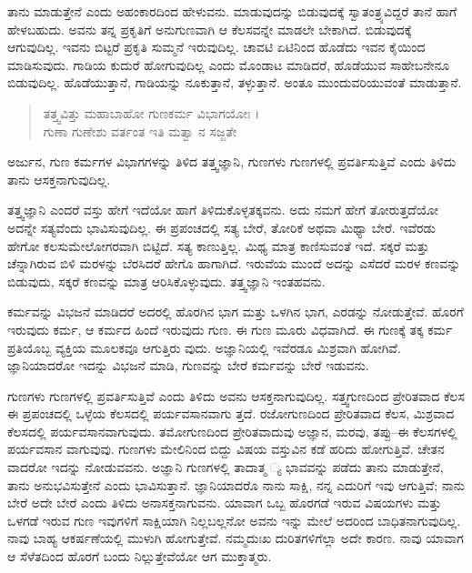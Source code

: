 ತಾನು ಮಾಡುತ್ತೇನೆ ಎಂದು ಅಹಂಕಾರದಿಂದ ಹೇಳುವನು. ಮಾಡುವುದನ್ನು ಬಿಡುವುದಕ್ಕೆ ಸ್ವಾತಂತ್ರ್ಯವಿದ್ದರೆ ತಾನೆ ಹಾಗೆ ಹೇಳಬಹುದು. ಅವನು ತನ್ನ ಪ್ರಕೃತಿಗೆ ಅನುಗುಣವಾಗಿ ಆ ಕೆಲಸವನ್ನೇ ಮಾಡಲೇ ಬೇಕಾಗಿದೆ. ಬಿಡುವುದಕ್ಕೆ ಆಗುವುದಿಲ್ಲ. ಇವನು ಬಿಟ್ಟರೆ ಪ್ರಕೃತಿ ಸುಮ್ಮನೆ ಇರುವುದಿಲ್ಲ. ಚಾವಟಿ ಏಟಿನಿಂದ ಹೊಡೆದು ಇವನ ಕೈಯಿಂದ ಮಾಡಿಸುವುದು. ಗಾಡಿಯ ಕುದುರೆ ಹೋಗುವುದಿಲ್ಲ ಎಂದು ಮೊಂಡಾಟ ಮಾಡಿದರೆ, ಹೊಡೆಯುವ ಸಾಹೇಬನೇನೂ ಬಿಡುವುದಿಲ್ಲ. ಹೊಡೆಯುತ್ತಾನೆ, ಗಾಡಿಯನ್ನು ನೂಕುತ್ತಾನೆ, ತಳ್ಳುತ್ತಾನೆ. ಅಂತೂ ಮುಂದುವರಿಯುವಂತೆ ಮಾಡುತ್ತಾನೆ.

\begin{verse}
ತತ್ತ್ವವಿತ್ತು ಮಹಾಬಾಹೋ ಗುಣಕರ್ಮ ವಿಭಾಗಯೋಃ ।\\ಗುಣಾ ಗುಣೇಶು ವರ್ತಂತ ಇತಿ ಮತ್ವಾ ನ ಸಜ್ಜತೇ 
\end{verse}

{\small ಅರ್ಜುನ, ಗುಣ ಕರ್ಮಗಳ ವಿಭಾಗಗಳನ್ನು ತಿಳಿದ ತತ್ತ್ವಜ್ಞಾನಿ, ಗುಣಗಳು ಗುಣಗಳಲ್ಲಿ ಪ್ರವರ್ತಿಸುತ್ತಿವೆ ಎಂದು ತಿಳಿದು ತಾನು ಆಸಕ್ತನಾಗುವುದಿಲ್ಲ.}

ತತ್ತ್ವಜ್ಞಾನಿ ಎಂದರೆ ವಸ್ತು ಹೇಗೆ ಇದೆಯೋ ಹಾಗೆ ತಿಳಿದುಕೊಳ್ಳತಕ್ಕವನು. ಅದು ನಮಗೆ ಹೇಗೆ ತೋರುತ್ತದೆಯೋ ಅದನ್ನೇ ಸತ್ಯವೆಂದು ಭಾವಿಸುವುದಿಲ್ಲ. ಈ ಪ್ರಪಂಚದಲ್ಲಿ ಸತ್ಯ ಬೇರೆ, ತೋರಿಕೆ ಅಥವಾ ಮಿಥ್ಯಾ ಬೇರೆ. ಇವೆರಡು ಹೇಗೋ ಕಲಸುಮೇಲೋಗರವಾಗಿ ಬಿಟ್ಟಿದೆ. ಸತ್ಯ ಕಾಣುತ್ತಿಲ್ಲ. ಮಿಥ್ಯ ಮಾತ್ರ ಕಾಣಿಸುವಂತೆ ಇದೆ. ಸಕ್ಕರೆ ಮತ್ತು ಚೆನ್ನಾಗಿರುವ ಬಿಳಿ ಮರಳನ್ನು ಬೆರಸಿದರೆ ಹೇಗೊ ಹಾಗಾಗಿದೆ. ಇರುವೆಯ ಮುಂದೆ ಅದನ್ನು ಎಸೆದರೆ ಮರಳ ಕಣವನ್ನು ಬಿಡುವುದು, ಸಕ್ಕರೆ ಕಣವನ್ನು ಮಾತ್ರ ಆರಿಸಿಕೊಳ್ಳುವುದು. ತತ್ತ್ವಜ್ಞಾನಿ ಇಂತಹವನು.

ಕರ್ಮವನ್ನು ವಿಭಜನೆ ಮಾಡಿದರೆ ಅದರಲ್ಲಿ ಹೊರಗಿನ ಭಾಗ ಮತ್ತು ಒಳಗಿನ ಭಾಗ, ಎರಡನ್ನು ನೋಡುತ್ತೇವೆ. ಹೊರಗೆ ಇರುವುದು ಕರ್ಮ, ಆ ಕರ್ಮದ ಹಿಂದೆ ಇರುವುದು ಗುಣ. ಈ ಗುಣ ಮೂರು ವಿಧವಾಗಿದೆ. ಈ ಗುಣಕ್ಕೆ ತಕ್ಕ ಕರ್ಮ ಪ್ರತಿಯೊಬ್ಬ ವ್ಯಕ್ತಿಯ ಮೂಲಕವೂ ಆಗುತ್ತಿರು ವುದು. ಅಜ್ಞಾನಿಯಲ್ಲಿ ಇವೆರಡೂ ಮಿಶ್ರವಾಗಿ ಹೋಗಿವೆ. ಜ್ಞಾನಿಯಾದರೋ ಇದನ್ನು ವಿಭಜನೆ ಮಾಡಿ, ಗುಣವನ್ನು ಬೇರೆ ಕರ್ಮವನ್ನು ಬೇರೆ ಇಡುವನು.

ಗುಣಗಳು ಗುಣಗಳಲ್ಲಿ ಪ್ರವರ್ತಿಸುತ್ತಿವೆ ಎಂದು ತಿಳಿದು ಅವನು ಆಸಕ್ತನಾಗುವುದಿಲ್ಲ. ಸತ್ತ್ವಗುಣದಿಂದ ಪ್ರೇರಿತವಾದ ಕೆಲಸ ಈ ಪ್ರಪಂಚದಲ್ಲಿ ಒಳ್ಳೆಯ ಕೆಲಸದಲ್ಲಿ ಪರ್ಯವಸಾನವಾಗು ತ್ತದೆ. ರಜೋಗುಣದಿಂದ ಪ್ರೇರಿತವಾದ ಕೆಲಸ, ಮಿಶ್ರವಾದ ಕೆಲಸದಲ್ಲಿ ಪರ್ಯವಸಾನವಾಗುವುದು. ತಮೋಗುಣದಿಂದ ಪ್ರೇರಿತವಾದುವು ಅಜ್ಞಾನ, ಮರವು, ತಪ್ಪು–ಈ ಕೆಲಸಗಳಲ್ಲಿ ಪರ್ಯವಸಾನ ವಾಗುವುವು. ಗುಣಗಳು ಮೇಲಿನಿಂದ ಬಿದ್ದು ವಿಷಯ ವಸ್ತುವಿನ ಕಡೆ ಹರಿದು ಹೋಗುತ್ತಿವೆ. ಚೇತನ ವಾದರೋ ಇದನ್ನು ನೋಡುವವನು. ಅಜ್ಞಾನಿ ಗುಣಗಳಲ್ಲಿ ತಾದಾತ್ಮ ್ಯ ಭಾವವನ್ನು ಪಡೆದು ತಾನು ಮಾಡುತ್ತೇನೆ, ತಾನು ಅನುಭವಿಸುತ್ತೇನೆ ಎಂದು ಭಾವಿಸುತ್ತಾನೆ. ಜ್ಞಾನಿಯಾದರೊ ನಾನು ಸಾಕ್ಷಿ, ನನ್ನ ಎದುರಿಗೆ ಇವು ಆಗುತ್ತಿವೆ; ನಾನು ಬೇರೆ ಅದೇ ಬೇರೆ ಎಂದು ತಿಳಿದು ಅನಾಸಕ್ತನಾಗುವನು. ಯಾವಾಗ ಒಬ್ಬ ಹೊರಗಡೆ ಇರುವ ವಿಷಯಗಳು ಮತ್ತು ಒಳಗಡೆ ಇರುವ ಗುಣ ಇವುಗಳಿಗೆ ಸಾಕ್ಷಿಯಾಗಿ ನಿಲ್ಲಬಲ್ಲನೋ ಅವನು ಇನ್ನು ಮೇಲೆ ಅದರಿಂದ ಬಾಧಿತನಾಗುವುದಿಲ್ಲ. ನಾವು ಬಾಹ್ಯ ಆಕರ್ಷಣೆಯಲ್ಲಿ ಮುಳುಗಿ ಹೋಗುತ್ತೇವೆ. ನಮ್ಮದುಃಖ ದುರಿತಗಳಿಗೆಲ್ಲಾ ಅದೇ ಕಾರಣ. ನಾವು ಯಾವಾಗ ಆ ಸೆಳೆತದಿಂದ ಹೊರಗೆ ಬಂದು ನಿಲ್ಲುತ್ತೇವೆಯೋ ಆಗ ಮುಕ್ತಾತ್ಮರು.


